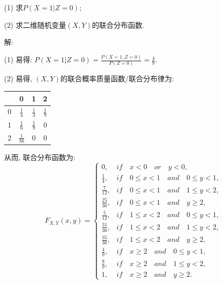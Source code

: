 \documentclass[standard]{ExBook}
\renewenvironment{shaded}{%
  \def\FrameCommand{\fboxsep=\FrameSep \colorbox{shadecolor}}%
  \MakeFramed{\advance\hsize-\width \FrameRestore}%
}{%
  \endMakeFramed
}
\begin{document}
\begin{qitems}
\begin{bbox}
\begin{shaded}
(1) 求$P(X = 1 | Z = 0)$;

(2) 求二维随机变量$(X,Y)$的联合分布函数.
    \end{shaded}
    \end{bbox}

\vspace{\dimexpr2.5cm-5em\relax}

解: 

(1) 易得: $P(X=1|Z=0)=\frac{P(X=1,Z=0)}{P(Z=0)}=\frac{4}{9}$.

(2) 易得, $(X,Y)$的联合概率质量函数/联合分布律为:
\begin{footnotesize}
\begin{center}
    \renewcommand{\arraystretch}{1.5}
    \setlength{\tabcolsep}{25pt}
    \begin{tabular}{c|c|c|c}
	    \hline
	    \diagbox{$X$}{$P(X,Y)$}{$Y$} & 0 & 1 & 2 \\
	    \hline
	    0 & $\displaystyle\frac{1}{4}$ & $\displaystyle\frac{1}{3}$ & $\displaystyle\frac{1}{9}$\\
	    \hline
	    1 & $\displaystyle\frac{1}{6}$ & $\displaystyle\frac{1}{9}$ & 0\\
	    \hline
        2 & $\displaystyle\frac{1}{36}$ & 0 & 0 \\
        \hline
    \end{tabular}
\end{center}
\end{footnotesize}
从而, 联合分布函数为:
\[
F_{X,Y}(x, y) = 
\begin{cases} 
0, & if\quad x < 0\quad or\quad y < 0, \\
\frac{1}{4}, & if\quad 0 \leq x < 1\quad and\quad 0 \leq y < 1, \\
\frac{7}{12}, & if\quad 0 \leq x < 1\quad and\quad 1 \leq y < 2, \\
\frac{25}{36}, & if\quad 0 \leq x < 1\quad and\quad y \geq 2, \\
\frac{5}{12}, & if\quad 1 \leq x < 2\quad and\quad 0 \leq y < 1, \\
\frac{31}{36}, & if\quad 1 \leq x < 2\quad and\quad 1 \leq y < 2, \\
\frac{35}{36}, & if\quad 1 \leq x < 2\quad and\quad y \geq 2, \\
\frac{4}{9}, & if\quad x \geq 2\quad and\quad 0 \leq y < 1, \\
\frac{8}{9}, & if\quad x \geq 2\quad and\quad 1 \leq y < 2, \\
1, & if\quad x \geq 2\quad and\quad y \geq 2.
\end{cases}
\]


\end{qitems}
\end{document}
